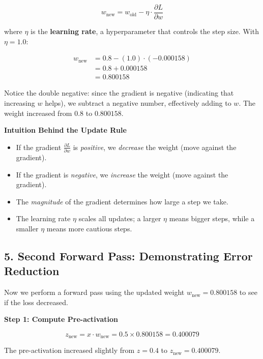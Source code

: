 \documentclass[12pt]{article}
\begin{document}
\[
w_{\text{new}} = w_{\text{old}} - \eta \cdot \frac{\partial L}{\partial w}
\]

where $\eta$ is the \textbf{learning rate}, a hyperparameter that controls the step size. With $\eta = 1.0$:

\begin{align*}
w_{\text{new}} &= 0.8 - (1.0) \cdot (-0.000158) \\
&= 0.8 + 0.000158 \\
&= 0.800158
\end{align*}

Notice the double negative: since the gradient is negative (indicating that increasing $w$ helps), we subtract a negative number, effectively adding to $w$. The weight increased from $0.8$ to $0.800158$.

\vspace{0.2cm}

\noindent\textbf{Intuition Behind the Update Rule}

\begin{itemize}
    \item If the gradient $\frac{\partial L}{\partial w}$ is \textit{positive}, we \textit{decrease} the weight (move against the gradient).
    \item If the gradient is \textit{negative}, we \textit{increase} the weight (move against the gradient).
    \item The \textit{magnitude} of the gradient determines how large a step we take.
    \item The learning rate $\eta$ scales all updates; a larger $\eta$ means bigger steps, while a smaller $\eta$ means more cautious steps.
\end{itemize}

\subsection*{5. Second Forward Pass: Demonstrating Error Reduction}

Now we perform a forward pass using the updated weight $w_{\text{new}} = 0.800158$ to see if the loss decreased.

\vspace{0.2cm}

\noindent\textbf{Step 1: Compute Pre-activation}

\[
z_{\text{new}} = x \cdot w_{\text{new}} = 0.5 \times 0.800158 = 0.400079
\]

The pre-activation increased slightly from $z = 0.4$ to $z_{\text{new}} = 0.400079$.
\end{document}
